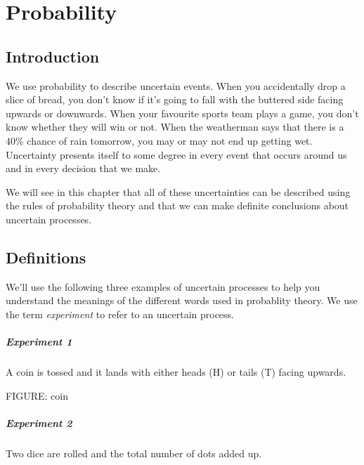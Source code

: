 \documentclass[a4paper,11pt]{report}
\begin{document}
\chapter{Probability}

\section{Introduction}
We use probability to describe uncertain events. When you accidentally
drop a slice of bread, you don't know if it's going to fall with the
buttered side facing upwards or downwards. When your favourite sports
team plays a game, you don't know whether they will win or not. When
the weatherman says that there is a 40\% chance of rain tomorrow, you
may or may not end up getting wet.  Uncertainty presents itself to
some degree in every event that occurs around us and in every decision
that we make.

We will see in this chapter that all of these uncertainties can be
described using the rules of probability theory and that we can make
definite conclusions about uncertain processes.

\section{Definitions}

We'll use the following three examples of uncertain processes to help
you understand the meanings of the different words used in probablity
theory. We use the term {\em experiment} to refer to an uncertain process.

\paragraph{Experiment 1} A coin is tossed and it lands with either heads
(H) or tails (T) facing upwards.

FIGURE: coin

\paragraph{Experiment 2} Two dice are rolled and the total number of dots
added up.

\begin{center}
\end{center}
\end{document}
